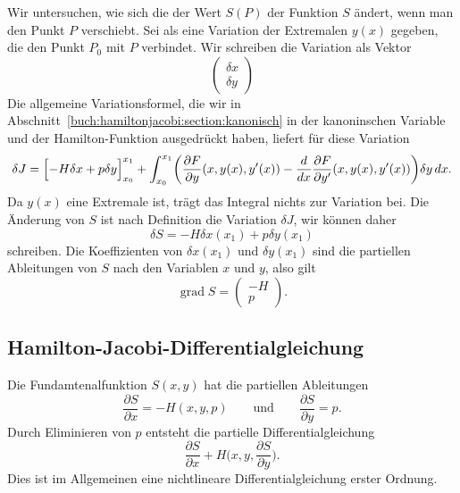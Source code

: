 Wir untersuchen, wie sich die der Wert $S(P)$ der Funktion $S$ ändert,
wenn man den Punkt $P$ verschiebt.
Sei als eine Variation der Extremalen $y(x)$ gegeben, die den Punkt $P_0$
mit $P$ verbindet.
Wir schreiben die Variation als Vektor
\[
\begin{pmatrix}
\delta x\\
\delta y
\end{pmatrix}
\]
Die allgemeine Variationsformel, die wir in 
Abschnitt~\ref{buch:hamiltonjacobi:section:kanonisch}
in der kanoninschen Variable und der Hamilton-Funktion ausgedrückt
haben, liefert für diese Variation
\[
\delta J
=
\Bigl[ -H\delta x + p \delta y \Bigr]_{x_0}^{x_1}
+
\int_{x_0}^{x_1}
\biggl(
\frac{\partial F}{\partial y}(x,y(x),y'(x))
-
\frac{d}{dx}
\frac{\partial F}{\partial y'}(x,y(x),y'(x))
\biggr)
\delta y
\,dx.
\]
Da $y(x)$ eine Extremale ist, trägt das Integral nichts zur
Variation bei.
Die Änderung von $S$ ist nach Definition die Variation $\delta J$,
wir können daher
\[
\delta S
=
-H\delta x(x_1) + p\delta y(x_1)
\]
schreiben.
Die Koeffizienten von $\delta x(x_1)$ und $\delta y(x_1)$ sind die
partiellen Ableitungen von $S$ nach den Variablen $x$ und $y$, also
gilt
\[
\operatorname{grad} S
=
\begin{pmatrix}
-H\\
p
\end{pmatrix}.
\]

%
%
\subsection{Hamilton-Jacobi-Differentialgleichung
\label{buch:hamiltonjacobi:jacobi:subsection:HJ-DGL}}
Die Fundamtenalfunktion $S(x,y)$ hat die partiellen
Ableitungen
\[
\frac{\partial S}{\partial x}
=
-H(x,y,p)
\qquad\text{und}\qquad
\frac{\partial S}{\partial y}
=
p.
\]
Durch Eliminieren von $p$ entsteht die partielle Differentialgleichung
\begin{equation}
\frac{\partial S}{\partial x}
+
H\biggl(x,y,\frac{\partial S}{\partial y}\biggr).
\label{buch:hamiltonjacobi:jacobi:eqn:hamilton-jacobi-dgl}
\end{equation}
Dies ist im Allgemeinen eine nichtlineare Differentialgleichung
erster Ordnung.

